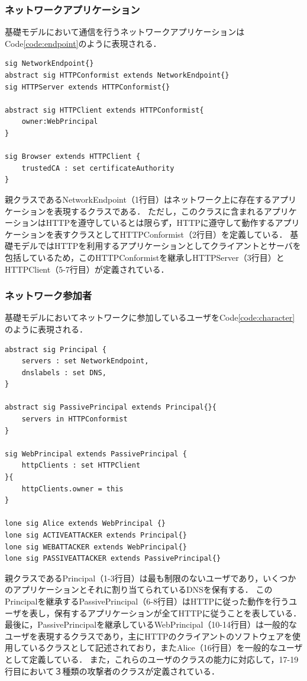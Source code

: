 \documentclass[12pt,a4paper]{jbook}
\begin{document}
\subsubsection{ネットワークアプリケーション}
基礎モデルにおいて通信を行うネットワークアプリケーションはCode\ref{code:endpoint}のように表現される．
\begin{lstlisting}[caption=ネットワーク参加者, label=code:endpoint]
sig NetworkEndpoint{}
abstract sig HTTPConformist extends NetworkEndpoint{}
sig HTTPServer extends HTTPConformist{}

abstract sig HTTPClient extends HTTPConformist{
	owner:WebPrincipal
}

sig Browser extends HTTPClient {
	trustedCA : set certificateAuthority
}
\end{lstlisting}
親クラスであるNetworkEndpoint（1行目）はネットワーク上に存在するアプリケーションを表現するクラスである．
ただし，このクラスに含まれるアプリケーションはHTTPを遵守しているとは限らず，HTTPに遵守して動作するアプリケーションを表すクラスとしてHTTPConformist（2行目）を定義している．
基礎モデルではHTTPを利用するアプリケーションとしてクライアントとサーバを包括しているため，このHTTPConformistを継承しHTTPServer（3行目）とHTTPClient（5-7行目）が定義されている．

\subsubsection{ネットワーク参加者}
基礎モデルにおいてネットワークに参加しているユーザをCode\ref{code:character}のように表現される．
\begin{lstlisting}[caption=ネットワーク参加者, label=code:character]
abstract sig Principal {
	servers : set NetworkEndpoint,
	dnslabels : set DNS,
}

abstract sig PassivePrincipal extends Principal{}{
	servers in HTTPConformist
}

sig WebPrincipal extends PassivePrincipal {
	httpClients : set HTTPClient
}{
	httpClients.owner = this
}

lone sig Alice extends WebPrincipal {}
lone sig ACTIVEATTACKER extends Principal{}
lone sig WEBATTACKER extends WebPrincipal{}
lone sig PASSIVEATTACKER extends PassivePrincipal{}
\end{lstlisting}
親クラスであるPrincipal（1-3行目）は最も制限のないユーザであり，いくつかのアプリケーションとそれに割り当てられているDNSを保有する．
このPrincipalを継承するPassivePrincipal（6-8行目）はHTTPに従った動作を行うユーザを表し，保有するアプリケーションが全てHTTPに従うことを表している．
最後に，PassivePrincipalを継承しているWebPrincipal（10-14行目）は一般的なユーザを表現するクラスであり，主にHTTPのクライアントのソフトウェアを使用しているクラスとして記述されており，またAlice（16行目）を一般的なユーザとして定義している．
また，これらのユーザのクラスの能力に対応して，17-19行目において３種類の攻撃者のクラスが定義されている．
\end{document}
